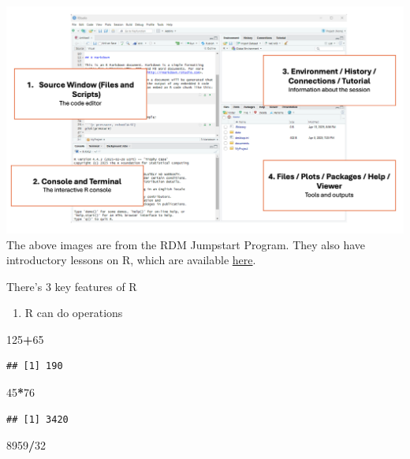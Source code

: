 \documentclass[
]{article}
\newenvironment{Shaded}{\begin{snugshade}}{\end{snugshade}}
\newcommand{\DecValTok}[1]{\textcolor[rgb]{0.00,0.00,0.81}{#1}}
\newcommand{\SpecialCharTok}[1]{\textcolor[rgb]{0.81,0.36,0.00}{\textbf{#1}}}
\providecommand{\tightlist}{%
  \setlength{\itemsep}{0pt}\setlength{\parskip}{0pt}}
\begin{document}
\includegraphics{notebook_images/r_4_panels.png} The above images are
from the RDM Jumpstart Program. They also have introductory lessons on
R, which are available
\href{https://alliance-rdm-gdr.github.io/rdm-jumpstart/2-ACT-1-RSetup.html}{here}.

There's 3 key features of R

\begin{enumerate}
\def\labelenumi{\arabic{enumi}.}
\tightlist
\item
  R can do operations
\end{enumerate}

\begin{Shaded}
\begin{Highlighting}[]
\DecValTok{125}\SpecialCharTok{+}\DecValTok{65}
\end{Highlighting}
\end{Shaded}

\begin{verbatim}
## [1] 190
\end{verbatim}

\begin{Shaded}
\begin{Highlighting}[]
\DecValTok{45}\SpecialCharTok{*}\DecValTok{76} 
\end{Highlighting}
\end{Shaded}

\begin{verbatim}
## [1] 3420
\end{verbatim}

\begin{Shaded}
\begin{Highlighting}[]
\DecValTok{8959}\SpecialCharTok{/}\DecValTok{32}
\end{Highlighting}
\end{Shaded}
\end{document}
